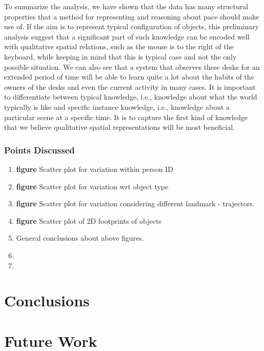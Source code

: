 \documentclass[letterpaper, 10 pt, conference]{ieeeconf}  %
\begin{document}
To summarize the analysis, we have shown that the data has many structural properties that a method for representing and reasoning about 
pace should make use of. If the aim is to represent typical configuration of objects, this preliminary analysis suggest that a significant 
part of such knowledge can be encoded well with qualitative spatial relations, such as the mouse is to the right of the keyboard, while 
keeping in mind that this is typical case and not the only possible situation. We can also see that a system that observes these desks for 
an extended period of time will be able to learn quite a lot about the habits of the owners of the desks and even the current activity in 
many cases. It is important to differentiate between typical knowledge, i.e., knowledge about what the world typically is like and specific 
instance knowledge, i.e., knowledge about a particular scene at a specific time. It is to capture the first kind of knowledge that we 
believe  qualitative spatial representations will be most beneficial. 

\subsubsection*{Points Discussed}
\begin{enumerate}
	\item \textbf{figure} Scatter plot for variation within person ID
	\item \textbf{figure} Scatter plot for variation wrt object type
	\item \textbf{figure} Scatter plot for variation considering different landmark - trajectors.
	\item \textbf{figure} Scatter plot of 2D footprints of objects
	\item General conclusions about above figures.
	\item 
	\item 
\end{enumerate}

\section{Conclusions}
\label{sec:Conclusions}

\section{Future Work}
\label{sec:Future Work}
\end{document}
